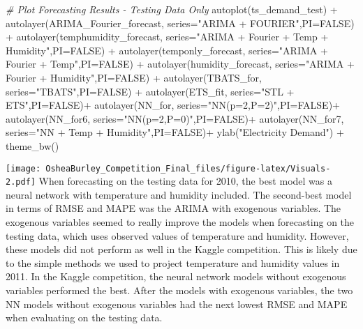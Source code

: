 \documentclass[
]{article}
\newenvironment{Shaded}{\begin{snugshade}}{\end{snugshade}}
\newcommand{\AttributeTok}[1]{\textcolor[rgb]{0.77,0.63,0.00}{#1}}
\newcommand{\CommentTok}[1]{\textcolor[rgb]{0.56,0.35,0.01}{\textit{#1}}}
\newcommand{\ConstantTok}[1]{\textcolor[rgb]{0.00,0.00,0.00}{#1}}
\newcommand{\FunctionTok}[1]{\textcolor[rgb]{0.00,0.00,0.00}{#1}}
\newcommand{\NormalTok}[1]{#1}
\newcommand{\SpecialCharTok}[1]{\textcolor[rgb]{0.00,0.00,0.00}{#1}}
\newcommand{\StringTok}[1]{\textcolor[rgb]{0.31,0.60,0.02}{#1}}
\begin{document}
\begin{Shaded}
\begin{Highlighting}[]
\CommentTok{\# Plot Forecasting Results {-} Testing Data Only}
\FunctionTok{autoplot}\NormalTok{(ts\_demand\_test) }\SpecialCharTok{+}
  \FunctionTok{autolayer}\NormalTok{(ARIMA\_Fourier\_forecast, }\AttributeTok{series=}\StringTok{"ARIMA + FOURIER"}\NormalTok{,}\AttributeTok{PI=}\ConstantTok{FALSE}\NormalTok{) }\SpecialCharTok{+}
  \FunctionTok{autolayer}\NormalTok{(temphumidity\_forecast, }\AttributeTok{series=}\StringTok{"ARIMA + Fourier + Temp + Humidity"}\NormalTok{,}\AttributeTok{PI=}\ConstantTok{FALSE}\NormalTok{) }\SpecialCharTok{+}
  \FunctionTok{autolayer}\NormalTok{(temponly\_forecast, }\AttributeTok{series=}\StringTok{"ARIMA + Fourier + Temp"}\NormalTok{,}\AttributeTok{PI=}\ConstantTok{FALSE}\NormalTok{) }\SpecialCharTok{+}
  \FunctionTok{autolayer}\NormalTok{(humidity\_forecast, }\AttributeTok{series=}\StringTok{"ARIMA + Fourier + Humidity"}\NormalTok{,}\AttributeTok{PI=}\ConstantTok{FALSE}\NormalTok{) }\SpecialCharTok{+}
  \FunctionTok{autolayer}\NormalTok{(TBATS\_for, }\AttributeTok{series=}\StringTok{"TBATS"}\NormalTok{,}\AttributeTok{PI=}\ConstantTok{FALSE}\NormalTok{) }\SpecialCharTok{+}
  \FunctionTok{autolayer}\NormalTok{(ETS\_fit, }\AttributeTok{series=}\StringTok{"STL + ETS"}\NormalTok{,}\AttributeTok{PI=}\ConstantTok{FALSE}\NormalTok{)}\SpecialCharTok{+}
  \FunctionTok{autolayer}\NormalTok{(NN\_for, }\AttributeTok{series=}\StringTok{"NN(p=2,P=2)"}\NormalTok{,}\AttributeTok{PI=}\ConstantTok{FALSE}\NormalTok{)}\SpecialCharTok{+}
  \FunctionTok{autolayer}\NormalTok{(NN\_for6, }\AttributeTok{series=}\StringTok{"NN(p=2,P=0)"}\NormalTok{,}\AttributeTok{PI=}\ConstantTok{FALSE}\NormalTok{)}\SpecialCharTok{+}
  \FunctionTok{autolayer}\NormalTok{(NN\_for7, }\AttributeTok{series=}\StringTok{"NN + Temp + Humidity"}\NormalTok{,}\AttributeTok{PI=}\ConstantTok{FALSE}\NormalTok{)}\SpecialCharTok{+}
  \FunctionTok{ylab}\NormalTok{(}\StringTok{"Electricity Demand"}\NormalTok{) }\SpecialCharTok{+}
  \FunctionTok{theme\_bw}\NormalTok{()}
\end{Highlighting}
\end{Shaded}

\texttt{[image: OsheaBurley\_Competition\_Final\_files/figure-latex/Visuals-2.pdf]}
When forecasting on the testing data for 2010, the best model was a
neural network with temperature and humidity included. The second-best
model in terms of RMSE and MAPE was the ARIMA with exogenous variables.
The exogenous variables seemed to really improve the models when
forecasting on the testing data, which uses observed values of
temperature and humidity. However, these models did not perform as well
in the Kaggle competition. This is likely due to the simple methods we
used to project temperature and humidity values in 2011. In the Kaggle
competition, the neural network models without exogenous variables
performed the best. After the models with exogenous variables, the two
NN models without exogenous variables had the next lowest RMSE and MAPE
when evaluating on the testing data.
\end{document}
